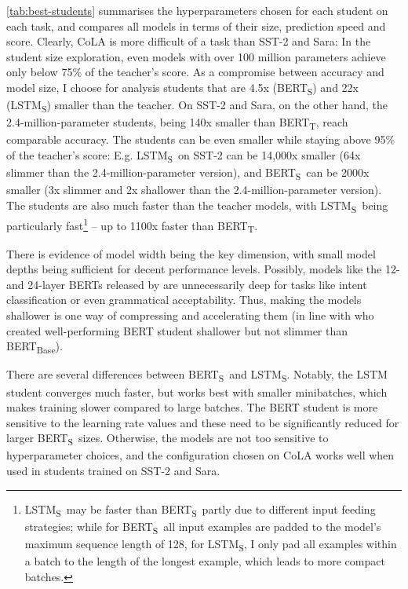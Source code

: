 \documentclass[bsc,frontabs,singlespacing,parskip,deptreport]{infthesis}
\def\BERTT{BERT\textsubscript{T}}
\def\BERTS{BERT\textsubscript{S}}
\def\LSTMS{LSTM\textsubscript{S}}
\begin{document}
{{    \autoref{tab:best-students} summarises the hyperparameters chosen for each student on each task, and compares all models in terms of their size, prediction speed and score.
    Clearly, CoLA is more difficult of a task than SST-2 and Sara: In the student size exploration, even models with over 100 million parameters achieve only below 75\% of the teacher's score. As a compromise between accuracy and model size, I choose for analysis students that are 4.5x (\BERTS) and 22x (\LSTMS) smaller than the teacher.
    On SST-2 and Sara, on the other hand, the 2.4-million-parameter students, being 140x smaller than \BERTT, reach comparable accuracy. The students can be even smaller while staying above 95\% of the teacher's score: E.g. \LSTMS~on SST-2 can be 14,000x smaller (64x slimmer than the 2.4-million-parameter version), and \BERTS~can be 2000x smaller (3x slimmer and 2x shallower than the 2.4-million-parameter version).
    The students are also much faster than the teacher models, with \LSTMS~being particularly fast\footnote{\LSTMS~may be faster than \BERTS~partly due to different input feeding strategies; while for \BERTS~all input examples are padded to the model's maximum sequence length of 128, for \LSTMS, I only pad all examples within a batch to the length of the longest example, which leads to more compact batches.} -- up to 1100x faster than \BERTT.
    
    There is evidence of model width being the key dimension, with small model depths being sufficient for decent performance levels.
    Possibly, models like the 12- and 24-layer BERTs released by \citet{Devlin_2018} are unnecessarily deep for tasks like intent classification or even grammatical acceptability. Thus, making the models shallower is one way of compressing and accelerating them (in line with \citet{Sanh_2019} who created well-performing BERT student shallower but not slimmer than BERT\textsubscript{Base}).

    There are several differences between \BERTS~and \LSTMS. Notably, the LSTM student converges much faster, but works best with smaller minibatches, which makes training slower compared to large batches. The BERT student is more sensitive to the learning rate values and these need to be significantly reduced for larger \BERTS~sizes.
    Otherwise, the models are not too sensitive to hyperparameter choices, and the configuration chosen on CoLA works well when used in students trained on SST-2 and Sara.

}}
\end{document}

